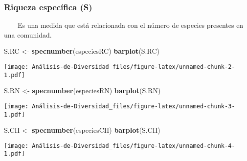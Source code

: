 \documentclass[
]{article}
\newenvironment{Shaded}{\begin{snugshade}}{\end{snugshade}}
\newcommand{\KeywordTok}[1]{\textcolor[rgb]{0.13,0.29,0.53}{\textbf{#1}}}
\newcommand{\NormalTok}[1]{#1}
\newcommand{\StringTok}[1]{\textcolor[rgb]{0.31,0.60,0.02}{#1}}
\begin{document}
\hypertarget{riqueza-especuxedfica-s}{%
\subsubsection{Riqueza específica (S)}\label{riqueza-especuxedfica-s}}

~~~~Es una medida que está relacionada con el número de especies
presentes en una comunidad.

\begin{Shaded}
\begin{Highlighting}[]
\NormalTok{S.RC <-}\StringTok{ }\KeywordTok{specnumber}\NormalTok{(especiesRC)}
\KeywordTok{barplot}\NormalTok{(S.RC)}
\end{Highlighting}
\end{Shaded}

\texttt{[image: Análisis-de-Diversidad\_files/figure-latex/unnamed-chunk-2-1.pdf]}

\begin{Shaded}
\begin{Highlighting}[]
\NormalTok{S.RN <-}\StringTok{ }\KeywordTok{specnumber}\NormalTok{(especiesRN)}
\KeywordTok{barplot}\NormalTok{(S.RN)}
\end{Highlighting}
\end{Shaded}

\texttt{[image: Análisis-de-Diversidad\_files/figure-latex/unnamed-chunk-3-1.pdf]}

\begin{Shaded}
\begin{Highlighting}[]
\NormalTok{S.CH <-}\StringTok{ }\KeywordTok{specnumber}\NormalTok{(especiesCH)}
\KeywordTok{barplot}\NormalTok{(S.CH)}
\end{Highlighting}
\end{Shaded}

\texttt{[image: Análisis-de-Diversidad\_files/figure-latex/unnamed-chunk-4-1.pdf]}
\end{document}
